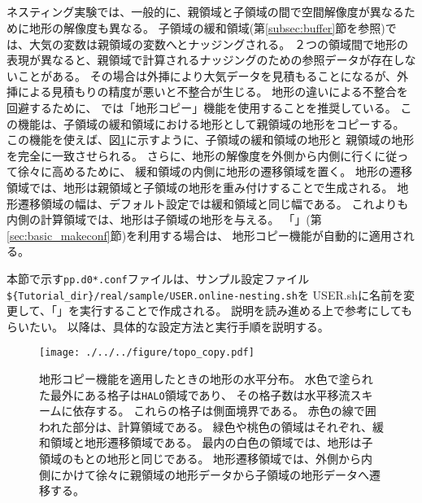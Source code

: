 \subsection{\SubsecCopyTopo} \label{subsec:nest_topo}
ネスティング実験では、一般的に、親領域と子領域の間で空間解像度が異なるために地形の解像度も異なる。
子領域の緩和領域(第\ref{subsec:buffer}節を参照)では、大気の変数は親領域の変数へとナッジングされる。
２つの領域間で地形の表現が異なると、親領域で計算されるナッジングのための参照データが存在しないことがある。
その場合は外挿により大気データを見積もることになるが、外挿による見積もりの精度が悪いと不整合が生じる。
%
地形の違いによる不整合を回避するために、
\scalerm では「地形コピー」機能を使用することを推奨している。
この機能は、子領域の緩和領域における地形として親領域の地形をコピーする。
この機能を使えば、図\ref{fig_topocopy}に示すように、子領域の緩和領域の地形と
親領域の地形を完全に一致させられる。
さらに、地形の解像度を外側から内側に行くに従って徐々に高めるために、
緩和領域の内側に地形の遷移領域を置く。
地形の遷移領域では、地形は親領域と子領域の地形を重み付けすることで生成される。
地形遷移領域の幅は、デフォルト設定では緩和領域と同じ幅である。
これよりも内側の計算領域では、地形は子領域の地形を与える。
「{\makeconftool}」(第\ref{sec:basic_makeconf}節)を利用する場合は、
地形コピー機能が自動的に適用される。


本節で示す\verb|pp.d0*.conf|ファイルは、サンプル設定ファイル\\
\verb|${Tutorial_dir}/real/sample/USER.online-nesting.sh|を
USER.shに名前を変更して、「{\makeconftool}」を実行することで作成される。
説明を読み進める上で参考にしてもらいたい。
以降は、具体的な設定方法と実行手順を説明する。


\begin{figure}[htb]
\begin{center}
  \texttt{[image: ./../../figure/topo\_copy.pdf]}\\
  \caption{地形コピー機能を適用したときの地形の水平分布。
水色で塗られた最外にある格子は\texttt{HALO}領域であり、
その格子数は水平移流スキームに依存する。
これらの格子は側面境界である。
赤色の線で囲われた部分は、計算領域である。
緑色や桃色の領域はそれぞれ、緩和領域と地形遷移領域である。
最内の白色の領域では、地形は子領域のもとの地形と同じである。
地形遷移領域では、外側から内側にかけて徐々に親領域の地形データから子領域の地形データへ遷移する。}
  \label{fig_topocopy}
\end{center}
\end{figure}


